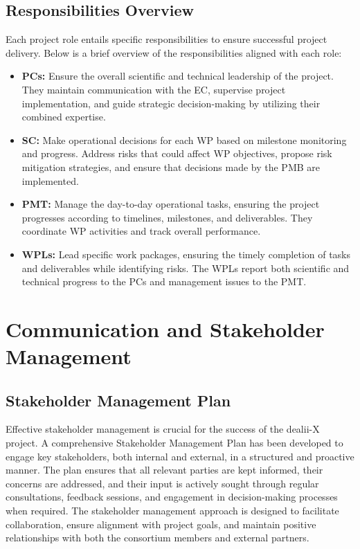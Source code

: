 \documentclass[a4paper,12pt]{article}
\begin{document}
\subsection{\textcolor{EUblue}{Responsibilities Overview}} 
Each project role entails specific responsibilities to ensure successful project delivery. Below is a brief overview of the responsibilities aligned with each role:

\begin{itemize}[left=2em, itemsep=1pt, topsep=0pt] 
    \item \textbf{PCs:} Ensure the overall scientific and technical leadership of the project. They maintain communication with the EC, supervise project implementation, and guide strategic decision-making by utilizing their combined expertise.
    \item \textbf{SC:} Make operational decisions for each WP based on milestone monitoring and progress. Address risks that could affect WP objectives, propose risk mitigation strategies, and ensure that decisions made by the PMB are implemented.
    \item \textbf{PMT:} Manage the day-to-day operational tasks, ensuring the project progresses according to timelines, milestones, and deliverables. They coordinate WP activities and track overall performance.
    \item \textbf{WPLs:} Lead specific work packages, ensuring the timely completion of tasks and deliverables while identifying risks. The WPLs report both scientific and technical progress to the PCs and management issues to the PMT.
\end{itemize}


\newpage

\section{\textcolor{EUblue}{Communication and Stakeholder Management}}
\label{sec:communication_management}

\subsection{\textcolor{EUblue}{Stakeholder Management Plan}} 

Effective stakeholder management is crucial for the success of the dealii-X project. A comprehensive Stakeholder Management Plan has been developed to engage key stakeholders, both internal and external, in a structured and proactive manner. The plan ensures that all relevant parties are kept informed, their concerns are addressed, and their input is actively sought through regular consultations, feedback sessions, and engagement in decision-making processes when required. The stakeholder management approach is designed to facilitate collaboration, ensure alignment with project goals, and maintain positive relationships with both the consortium members and external partners.
\end{document}
